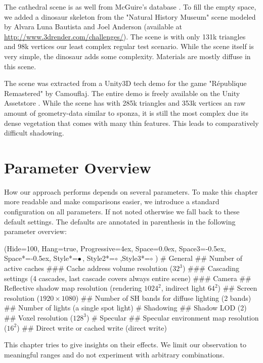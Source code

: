 \documentclass[thesis.tex]{subfiles}
\begin{document}
The  cathedral scene is as well from McGuire's database \cite{bib:McGuire2011Data}.
To fill the empty space, we added a dinosaur skeleton from the "Natural History Museum" scene modeled by Alvara Luna Bautista and Joel Anderson (available at \url{http://www.3drender.com/challenges/}).
The scene is with only 131k triangles and 98k vertices our least complex regular test scenario.
While the scene itself is very simple, the dinosaur adds some complexity.
Materials are mostly diffuse in this scene.

The  scene was extracted from a Unity3D tech demo for the game "République Remastered" by Camouflaj.
The entire demo is freely available on the Unity Assetstore \cite{bib:republique}.
While the scene has with 285k triangles and 353k vertices an raw amount of geometry-data similar to sponza, it is still the most complex due its dense vegetation that comes with many thin features.
This leads to comparatively difficult shadowing.

\section{Parameter Overview} \label{sec:eva:params}
How our approach performs depends on several parameters.
To make this chapter more readable and make comparisons easier, we introduce a standard configuration on all parameters.
If not noted otherwise we fall back to these default settings.
The defaults are annotated in parenthesis in the following parameter overview:
\begin{easylist}
\ListProperties(Hide=100, Hang=true, Progressive=4ex, Space=0.0ex, Space3=-0.5ex, Space*=-0.5ex, Style*=$\bullet\,$,
Style2*=$\circ$ ,Style3*=$\circ$ )
# General
## Number of active caches
### Cache address volume resolution ($32^3$)
### Cascading settings (4 cascades, last cascade covers always entire scene)
### Camera
## Reflective shadow map resolution (rendering $1024^2$, indirect light $64^2$)
## Screen resolution ($1920\times1080$)
## Number of SH bands for diffuse lighting (2 bands)
## Number of lights (a single spot light)
# Shadowing
## Shadow LOD (2)
## Voxel resolution ($128^3$)
# Specular
## Specular environment map resolution ($16^2$)
## Direct write or cached write (direct write)
\end{easylist}
This chapter tries to give insights on their effects.
We limit our observation to meaningful ranges and do not experiment with arbitrary combinations.
\end{document}

